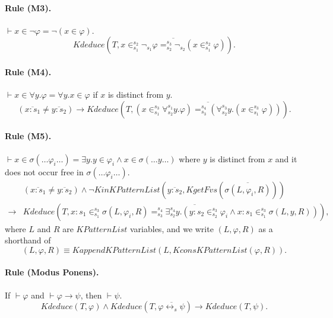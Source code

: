 \documentclass[UTF8,11pt]{article}
\theoremstyle{plain}
\theoremstyle{definition}
\theoremstyle{remark}
\newcommand{\cln}{{:}}
\newcommand{\KPatternList}{\mathit{KPatternList}}
\newcommand{\KconsKPatternList}{\mathit{KconsKPatternList}}
\newcommand{\KappendKPatternList}{\mathit{KappendKPatternList}}
\newcommand{\KinKPatternList}{\mathit{KinKPatternList}}
\newcommand{\KgetFvs}{\mathit{KgetFvs}}
\newcommand{\Kdeduce}{\mathit{Kdeduce}}
\begin{document}
\paragraph{Rule (M3).}
$\vdash x \in \neg \varphi = \neg (x \in \varphi)$.
\begin{equation*}
\Kdeduce(T, \overline{x \in_{s_1}^{s_2} \neg_{s_1} \varphi =_{s_2}^{s_3} \neg_{s_2} (x \in_{s_1}^{s_2} \varphi)}).
\end{equation*}

\paragraph{Rule (M4).}
$\vdash x \in \forall y . \varphi = \forall y . x \in \varphi$ if $x$ is distinct from $y$.
\begin{equation*}
(\overline{x \cln s_1} \neq \overline{y \cln s_2})  \to \Kdeduce(T, \overline{(x \in_{s_1}^{s_3} \forall_{s_2}^{s_1} y . \varphi) =_{s_3}^{s_4} (\forall_{s_2}^{s_3} y . (x \in_{s_1}^{s_3} \varphi))}).
\end{equation*}

\paragraph{Rule (M5).}
$\vdash x \in \sigma(\dots \varphi_i \dots) = \exists y . y \in \varphi_i \wedge x \in \sigma(\dots y \dots)$ where $y$ is distinct from $x$ and it does not occur free in $\sigma(\dots \varphi_i \dots)$.
\begin{align*}
& (\overline{x \cln s_1} \neq \overline{y \cln s_2}) 
  \wedge \neg \KinKPatternList(\overline{y \cln s_2}, \KgetFvs(\overline{\sigma(L, \varphi_i, R)}))
\\
\to & \Kdeduce(T, \overline{x \cln s_1 \in_{s_1}^{s_3} \sigma(L, 
\varphi_i, R) =_{s_3}^{s_4} \exists_{s_2}^{s_4} y . (y \cln s_2 \in_{s_2}^{s_3} \varphi_i \wedge x \cln s_1 \in_{s_1}^{s_3} \sigma(L, y, R))}),
\end{align*}
where $L$ and $R$ are $\KPatternList$ variables, and we write $(L, \varphi, R)$ as a shorthand of
$$(L, \varphi, R) \equiv \KappendKPatternList(L, \KconsKPatternList(\varphi, R)).$$

\paragraph{Rule (Modus Ponens).}
If $\vdash \varphi$ and $\vdash \varphi \to \psi$, then $\vdash \psi$.
\begin{equation*}
\Kdeduce(T, \varphi) \wedge \Kdeduce(T, \overline{\varphi \leftrightarrow_s \psi}) \to 
\Kdeduce(T, \psi).
\end{equation*}
\end{document}
